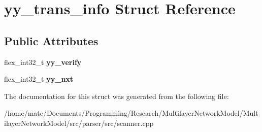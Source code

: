 \hypertarget{structyy__trans__info}{}\section{yy\+\_\+trans\+\_\+info Struct Reference}
\label{structyy__trans__info}
\subsection*{Public Attributes}
\begin{DoxyCompactItemize}
\item 
flex\+\_\+int32\+\_\+t {\bfseries yy\+\_\+verify}\hypertarget{structyy__trans__info_a5c9f61e770deef50bd4e697310342fe9}{}\label{structyy__trans__info_a5c9f61e770deef50bd4e697310342fe9}

\item 
flex\+\_\+int32\+\_\+t {\bfseries yy\+\_\+nxt}\hypertarget{structyy__trans__info_ae0715250c2bef261e596e77e0030f13e}{}\label{structyy__trans__info_ae0715250c2bef261e596e77e0030f13e}

\end{DoxyCompactItemize}


The documentation for this struct was generated from the following file\+:\begin{DoxyCompactItemize}
\item 
/home/mate/\+Documents/\+Programming/\+Research/\+Multilayer\+Network\+Model/\+Multilayer\+Network\+Model/src/parser/src/scanner.\+cpp\end{DoxyCompactItemize}
